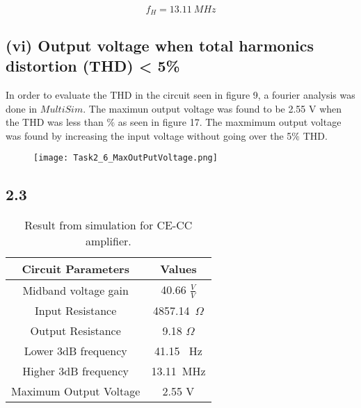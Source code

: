 	$$f_{H} = 13.11 \ M Hz $$
\pagebreak
  \subsection*{(vi) Output voltage when total harmonics distortion (THD) < 5\%}

  In order to evaluate the THD in the circuit seen in figure 9, a fourier analysis was done in $MultiSim$. The maximun output voltage was found to be 2.55 V when the THD was less than $\%$ as seen in figure 17. The maxmimum output voltage was found by increasing the input voltage without going over the 5$\%$ THD.	


	\begin{figure}[h!]
        \centering
        \texttt{[image: Task2\_6\_MaxOutPutVoltage.png]}
	\end{figure}
    
\pagebreak
  
\subsection*{2.3}
  
	\begin{table}[htbp]
     \centering
       \begin{tabular}{c|c}
        \hline
         Circuit Parameters & Values \\
       \hline
        Midband voltage gain          & 40.66 $\frac{V}{V}$ \\
        Input Resistance & 4857.14\ $\Omega$ \\
        Output Resistance & 9.18 $\Omega$\\
        Lower 3dB frequency & 41.15 \ Hz\\
        Higher 3dB frequency & 13.11\ MHz\\
        Maximum Output Voltage & 2.55 V\\
       \end{tabular}%
     \caption{Result from simulation for CE-CC amplifier.}
     \label{tab:addlabel}%
	\end{table}%